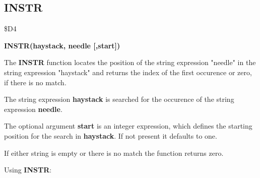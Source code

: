 \subsection{INSTR}
\begin{description}[leftmargin=3cm,style=nextline]
\item [Token:] \$D4
\item [Format:] {\bf INSTR(haystack, needle [,start])}
\item [Usage:] The {\bf INSTR} function locates the
               position of the string expression "needle"
               in the string expression "haystack" and
               returns the index of the first occurence
               or zero, if there is no match.

               The string expression {\bf haystack}
               is searched for the occurence of the
               string expression
               {\bf needle}.

               The optional argument {\bf start} is an integer
               expression, which defines the starting position
               for the search in {\bf haystack}. If not present
               it defaults to one.

\item [Remarks:] If either string is empty or there is no match
               the function returns zero.

\item [Example:] Using {\bf INSTR}:
\end{description}


\newpage
